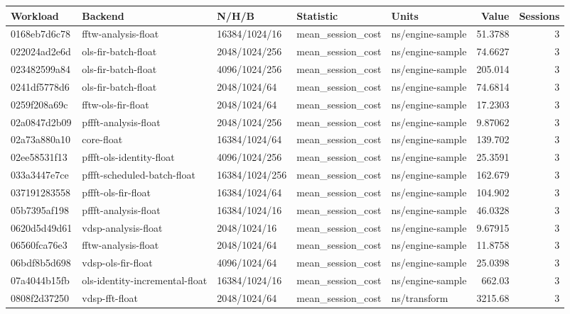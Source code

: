 \begingroup\scriptsize
\begin{longtable}{lllllrr}
Workload & Backend & N/H/B & Statistic & Units & Value & Sessions \\
\hline
0168eb7d6c78 & fftw-analysis-float & 16384/1024/16 & mean\_session\_cost & ns/engine-sample & 51.3788 & 3 \\
022024ad2e6d & ols-fir-batch-float & 2048/1024/256 & mean\_session\_cost & ns/engine-sample & 74.6627 & 3 \\
023482599a84 & ols-fir-batch-float & 4096/1024/256 & mean\_session\_cost & ns/engine-sample & 205.014 & 3 \\
0241df5778d6 & ols-fir-batch-float & 2048/1024/64 & mean\_session\_cost & ns/engine-sample & 74.6814 & 3 \\
0259f208a69c & fftw-ols-fir-float & 2048/1024/64 & mean\_session\_cost & ns/engine-sample & 17.2303 & 3 \\
02a0847d2b09 & pffft-analysis-float & 2048/1024/256 & mean\_session\_cost & ns/engine-sample & 9.87062 & 3 \\
02a73a880a10 & core-float & 16384/1024/64 & mean\_session\_cost & ns/engine-sample & 139.702 & 3 \\
02ee58531f13 & pffft-ols-identity-float & 4096/1024/256 & mean\_session\_cost & ns/engine-sample & 25.3591 & 3 \\
033a3447e7ce & pffft-scheduled-batch-float & 16384/1024/256 & mean\_session\_cost & ns/engine-sample & 162.679 & 3 \\
037191283558 & pffft-ols-fir-float & 16384/1024/64 & mean\_session\_cost & ns/engine-sample & 104.902 & 3 \\
05b7395af198 & pffft-analysis-float & 16384/1024/16 & mean\_session\_cost & ns/engine-sample & 46.0328 & 3 \\
0620d5d49d61 & vdsp-analysis-float & 2048/1024/16 & mean\_session\_cost & ns/engine-sample & 9.67915 & 3 \\
06560fca76e3 & fftw-analysis-float & 2048/1024/64 & mean\_session\_cost & ns/engine-sample & 11.8758 & 3 \\
06bdf8b5d698 & vdsp-ols-fir-float & 4096/1024/64 & mean\_session\_cost & ns/engine-sample & 25.0398 & 3 \\
07a4044b15fb & ols-identity-incremental-float & 16384/1024/16 & mean\_session\_cost & ns/engine-sample & 662.03 & 3 \\
0808f2d37250 & vdsp-fft-float & 2048/1024/64 & mean\_session\_cost & ns/transform & 3215.68 & 3 \\

\end{longtable}
